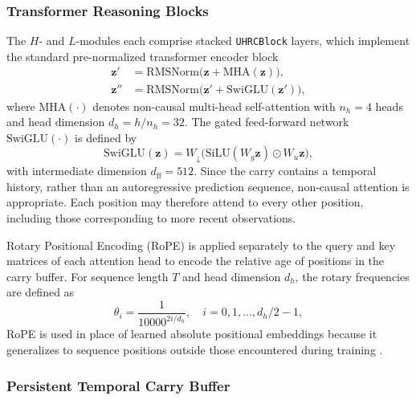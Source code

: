 \documentclass[12pt, a4paper]{article}
\begin{document}
\subsubsection{Transformer Reasoning Blocks}
\label{sec:blocks}

The $H$- and $L$-modules each comprise stacked \texttt{UHRCBlock} layers, which implement the standard pre-normalized transformer encoder block
\begin{align}
    \mathbf{z}' &= \mathrm{RMSNorm}\bigl(\mathbf{z} + \mathrm{MHA}(\mathbf{z})\bigr),
    \label{eq:attn_block} \\
    \mathbf{z}'' &= \mathrm{RMSNorm}\bigl(\mathbf{z}' + \mathrm{SwiGLU}(\mathbf{z}')\bigr),
    \label{eq:mlp_block}
\end{align}
where $\mathrm{MHA}(\cdot)$ denotes non-causal multi-head self-attention with $n_h = 4$ heads and head dimension $d_h = h / n_h = 32$.
The gated feed-forward network $\mathrm{SwiGLU}(\cdot)$ is defined by
\begin{equation}
    \mathrm{SwiGLU}(\mathbf{z}) =
        W_{\downarrow}\bigl(\mathrm{SiLU}(W_g \mathbf{z}) \odot W_u \mathbf{z}\bigr),
\end{equation}
with intermediate dimension $d_{\mathrm{ff}} = 512$.
Since the carry contains a temporal history, rather than an autoregressive prediction sequence, non-causal attention is appropriate.
Each position may therefore attend to every other position, including those corresponding to more recent observations.

Rotary Positional Encoding (RoPE) is applied separately to the query and key matrices of each attention head to encode the relative age of positions in the carry buffer.
For sequence length $T$ and head dimension $d_h$, the rotary frequencies are defined as
\begin{equation}
    \theta_i = \frac{1}{10000^{2i/d_h}}, \quad i = 0, 1, \ldots, d_h/2 - 1,
\end{equation}
RoPE is used in place of learned absolute positional embeddings because it generalizes to sequence positions outside those encountered during training \parencite{wang_hierarchical_2025}.


\subsubsection{Persistent Temporal Carry Buffer}
\label{sec:carry}
\end{document}
